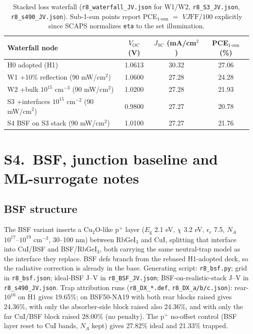 \documentclass[11pt]{article}
\begin{document}
\begin{table}[htbp]
\centering
{\small\setlength{\tabcolsep}{3pt}
\begin{tabularx}{\textwidth}{Xccc}
\hline
Waterfall node & $V_{\mathrm{OC}}$ (V) & $J_{\mathrm{SC}}$ (mA/cm$^{2}$) & PCE$_{1\text{-sun}}$ (\%)\\
\hline
H0 adopted (H1) & 1.0613 & 30.32 & 27.06\\
W1 +10\% reflection (90 mW/cm$^{2}$) & 1.0600 & 27.28 & 24.28\\
W2 +bulk $10^{15}$ cm$^{-3}$ (90 mW/cm$^{2}$) & 1.0200 & 27.28 & 21.93\\
S3 +interfaces $10^{15}$ cm$^{-2}$ (90 mW/cm$^{2}$) & 0.9800 & 27.27 & 20.78\\
S4 BSF on S3 stack (90 mW/cm$^{2}$) & 1.0100 & 27.27 & 21.76\\
\hline
\end{tabularx}}
\caption{Stacked loss waterfall (\texttt{r8\_waterfall\_JV.json} for W1/W2, \texttt{r8\_S3\_JV.json}, \texttt{r8\_s490\_JV.json}). Sub-1-sun points report PCE$_{1\text{-sun}}$ $=$ $VJ\mathrm{FF}/100$ explicitly since SCAPS normalizes \texttt{eta} to the set illumination.}
\par{}\par
\end{table}

\section*{S4.\ BSF, junction baseline and ML-surrogate notes}
\subsection*{BSF structure}
The BSF variant inserts a Cu$_{2}$O-like p$^{+}$ layer ($E_{\mathrm{g}}$ 2.1 eV, $\chi$ 3.2 eV, $\epsilon_{r}$ 7.5, $N_{A}$ $10^{17}$--$10^{19}$ cm$^{-3}$, 30--100 nm) between RbGeI$_{3}$ and CuI, splitting that interface into CuI/BSF and BSF/RbGeI$_{3}$, both carrying the same neutral-trap model as the interface they replace. BSF defs branch from the rebased H1-adopted deck, so the radiative correction is already in the base. Generating script: \texttt{r8\_bsf.py}; grid in \texttt{r8\_bsf.json}; ideal-BSF J--V in \texttt{r8\_BSF\_JV.json}; BSF-on-realistic-stack J--V in \texttt{r8\_s490\_JV.json}. Trap attribution runs (\texttt{r8\_DX\_*.def}, \texttt{r8\_DX\_a/b/c.json}): rear-$10^{16}$ on H1 gives 19.65\%; on BSF50-NA19 with both rear blocks raised gives 24.36\%, with only the absorber-side block raised also 24.36\%, and with only the far CuI/BSF block raised 28.00\% (no penalty). The p$^{+}$ no-offset control (BSF layer reset to CuI bands, $N_{A}$ kept) gives 27.82\% ideal and 21.33\% trapped.
\end{document}
